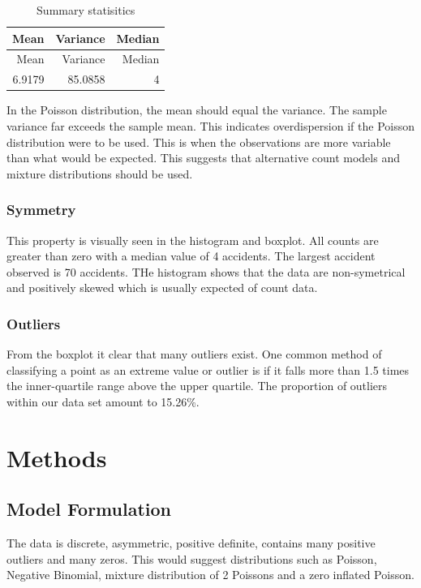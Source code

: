 \documentclass[11pt,preprint, authoryear]{elsarticle}
\numberwithin{equation}{section}
\numberwithin{figure}{section}
\numberwithin{table}{section}
\begin{document}
\begin{longtable}[]{@{}rrr@{}}
\caption{Summary statisitics}\tabularnewline
\toprule
Mean & Variance & Median\tabularnewline
\midrule
\endfirsthead
\toprule
Mean & Variance & Median\tabularnewline
\midrule
\endhead
6.9179 & 85.0858 & 4\tabularnewline
\bottomrule
\end{longtable}

In the Poisson distribution, the mean should equal the variance. The
sample variance far exceeds the sample mean. This indicates
overdispersion if the Poisson distribution were to be used. This is when
the observations are more variable than what would be expected. This
suggests that alternative count models and mixture distributions should
be used.

\subsubsection{Symmetry}\label{symmetry}

This property is visually seen in the histogram and boxplot. All counts
are greater than zero with a median value of 4 accidents. The largest
accident observed is 70 accidents. THe histogram shows that the data are
non-symetrical and positively skewed which is usually expected of count
data.

\subsubsection{Outliers}\label{outliers}

From the boxplot it clear that many outliers exist. One common method of
classifying a point as an extreme value or outlier is if it falls more
than 1.5 times the inner-quartile range above the upper quartile. The
proportion of outliers within our data set amount to 15.26\%.

\section{Methods}\label{methods}

\subsection{Model Formulation}\label{model-formulation}

The data is discrete, asymmetric, positive definite, contains many
positive outliers and many zeros. This would suggest distributions such
as Poisson, Negative Binomial, mixture distribution of 2 Poissons and a
zero inflated Poisson.
\end{document}
